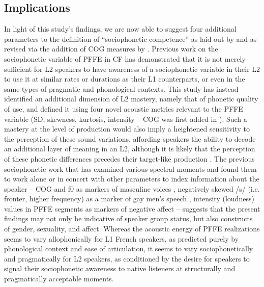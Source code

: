 \documentclass[output=paper,colorlinks,citecolor=brown,draftmode]{langscibook}
\begin{document}
\subsection{Implications}
In light of this study’s findings, we are now able to suggest four additional parameters to the definition of “sociophonetic competence” as laid out by \citet{dalola2017sociophonetic} and as revised via the addition of COG measures by \citet{dalola2019shape,dalola2020redefining}. Previous work on the sociophonetic variable of PFFE in CF has demonstrated that it is not merely sufficient for L2 speakers to have awareness of a sociophonetic variable in their L2 to use it at similar rates or durations as their L1 counterparts, or even in the same types of pragmatic and phonological contexts. This study has instead identified an additional dimension of L2 mastery, namely that of phonetic quality of use, and defined it using four novel acoustic metrics relevant to the PFFE variable (SD, skewness, kurtosis, intensity -- COG was first added in \citealt{dalola2019shape}). Such a mastery at the level of production would also imply a heightened sensitivity to the perception of these sound variations, affording speakers the ability to decode an additional layer of meaning in an L2, although it is likely that the perception of these phonetic differences precedes their target-like production \citep{flege1984limits}.
The previous sociophonetic work that has examined various spectral moments and found them to work alone or in concert with other parameters to index information about the speaker -- COG and f0 as markers of masculine voices \citep{zimman2017gender}, negatively skewed /s/ (i.e. fronter, higher frequency) as a marker of gay men’s speech \citep{munson2006acoustic}, intensity (loudness) values in PFFE segments as markers of negative affect \citep{dalola2016perception} -- suggests that the present findings may not only be indicative of speaker group status, but also constructs of gender, sexuality, and affect.
Whereas the acoustic energy of PFFE realizations seems to vary allophonically for L1 French speakers, as predicted purely by phonological context and ease of articulation, it seems to vary sociophonetically and pragmatically for L2 speakers, as conditioned by the desire for speakers to signal their sociophonetic awareness to native listeners at structurally and pragmatically acceptable moments.
\end{document}
